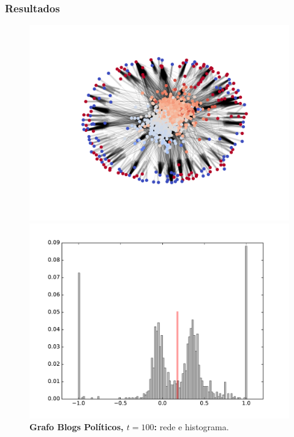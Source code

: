 \begin{frame}
  \frametitle{Resultados}

  \begin{figure}
  \centering
  \begin{minipage}{5.5cm}
    \includegraphics[width=\textwidth]{./figures/99N100}
  \end{minipage}
  \begin{minipage}{5.5cm}
    \includegraphics[width=\textwidth]{./figures/99H100}
  \end{minipage}
  \vspace{5mm}
  \caption*{\textbf{Grafo Blogs Políticos, $t = 100$:} rede e histograma.}
  \end{figure}
\end{frame}

